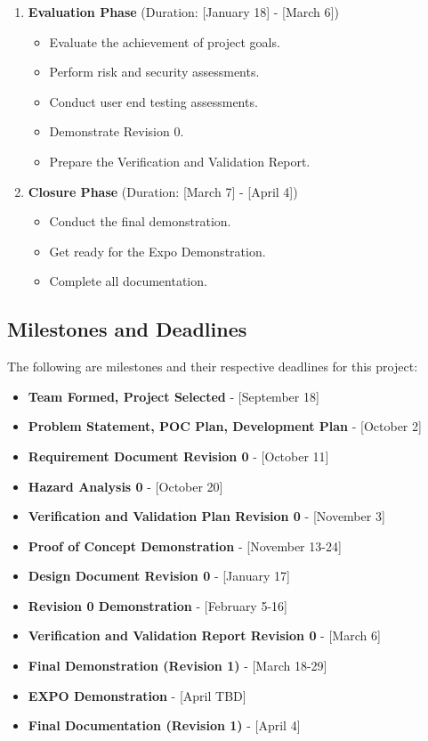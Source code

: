 \documentclass{article}
\begin{document}
\begin{enumerate}
  \item \textbf{Evaluation Phase} (Duration: [January 18] - [March 6])
  \begin{itemize}
    \item Evaluate the achievement of project goals.
    \item Perform risk and security assessments.
    \item Conduct user end testing assessments.
    \item Demonstrate Revision 0.
    \item Prepare the Verification and Validation Report.
  \end{itemize}

  \item \textbf{Closure Phase} (Duration: [March 7] - [April 4])
  \begin{itemize}
    \item Conduct the final demonstration.
    \item Get ready for the Expo Demonstration.
    \item Complete all documentation.
  \end{itemize}
\end{enumerate}


\subsection{Milestones and Deadlines}

The following are milestones and their respective deadlines for this project:

\begin{itemize}
  \item \textbf{Team Formed, Project Selected} - [September 18]
  \item \textbf{Problem Statement, POC Plan, Development Plan} - [October 2]
  \item \textbf{Requirement Document  Revision 0} - [October 11]
  \item \textbf{Hazard Analysis 0} - [October 20]
  \item \textbf{Verification and Validation Plan Revision 0} - [November 3]
  \item \textbf{Proof of Concept Demonstration} - [November 13-24]
  \item \textbf{Design Document Revision 0} - [January 17]
  \item \textbf{Revision 0 Demonstration} - [February 5-16]
  \item \textbf{Verification and Validation Report Revision 0} - [March 6]
  \item \textbf{Final Demonstration (Revision 1)} - [March 18-29]
  \item \textbf{EXPO Demonstration} - [April TBD]
  \item \textbf{Final Documentation (Revision 1)} - [April 4]
\end{itemize}
\end{document}
